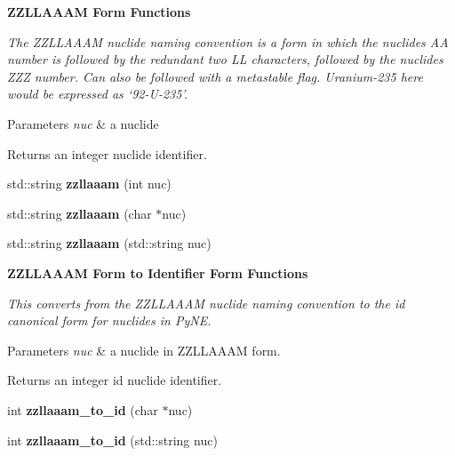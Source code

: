 \begin{Indent}{\bf Z\+Z\+L\+L\+A\+A\+A\+M Form Functions}\par
{\em The Z\+Z\+L\+L\+A\+A\+A\+M nuclide naming convention is a form in which the nuclides A\+A number is followed by the redundant two L\+L characters, followed by the nuclides Z\+Z\+Z number. Can also be followed with a metastable flag. Uranium-\/235 here would be expressed as ‘92-\/\+U-\/235’. 
\begin{DoxyParams}{Parameters}
{\em nuc} & a nuclide \\
\hline
\end{DoxyParams}
\begin{DoxyReturn}{Returns}
an integer nuclide identifier. 
\end{DoxyReturn}
}\begin{DoxyCompactItemize}
\item 
\hypertarget{namespacepyne_1_1nucname_ab11175f9aa7d8f9437b3b43531c94a89}{std\+::string {\bfseries zzllaaam} (int nuc)}\label{namespacepyne_1_1nucname_ab11175f9aa7d8f9437b3b43531c94a89}

\item 
\hypertarget{namespacepyne_1_1nucname_a07ef99280b627f85af2901604b3f6285}{std\+::string {\bfseries zzllaaam} (char $\ast$nuc)}\label{namespacepyne_1_1nucname_a07ef99280b627f85af2901604b3f6285}

\item 
\hypertarget{namespacepyne_1_1nucname_a3e184c78ba73f04348963e2158c32a8d}{std\+::string {\bfseries zzllaaam} (std\+::string nuc)}\label{namespacepyne_1_1nucname_a3e184c78ba73f04348963e2158c32a8d}

\end{DoxyCompactItemize}
\end{Indent}
\begin{Indent}{\bf Z\+Z\+L\+L\+A\+A\+A\+M Form to Identifier Form Functions}\par
{\em This converts from the Z\+Z\+L\+L\+A\+A\+A\+M nuclide naming convention to the id canonical form for nuclides in Py\+N\+E. 
\begin{DoxyParams}{Parameters}
{\em nuc} & a nuclide in Z\+Z\+L\+L\+A\+A\+A\+M form. \\
\hline
\end{DoxyParams}
\begin{DoxyReturn}{Returns}
an integer id nuclide identifier. 
\end{DoxyReturn}
}\begin{DoxyCompactItemize}
\item 
\hypertarget{namespacepyne_1_1nucname_a62543b28a461188a2872582314d4ee05}{int {\bfseries zzllaaam\+\_\+to\+\_\+id} (char $\ast$nuc)}\label{namespacepyne_1_1nucname_a62543b28a461188a2872582314d4ee05}

\item 
\hypertarget{namespacepyne_1_1nucname_a55b0daddcb0ff68650685e50c015f960}{int {\bfseries zzllaaam\+\_\+to\+\_\+id} (std\+::string nuc)}\label{namespacepyne_1_1nucname_a55b0daddcb0ff68650685e50c015f960}

\end{DoxyCompactItemize}
\end{Indent}
